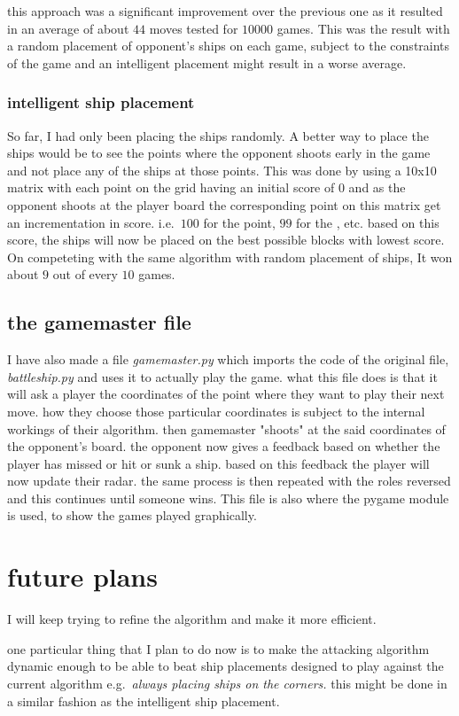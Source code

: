 \documentclass{article}
\begin{document}
	this approach was a significant improvement over the previous one as it resulted in an average of about $44$ moves tested for $10000$ games. This was the result with a random placement of opponent's ships on each game, subject to the constraints of the game and an intelligent placement might result in a worse average.
	
	\subsubsection{intelligent ship placement}
	
	So far, I had only been placing the ships randomly. A better way to place the ships would be to see the points where the opponent shoots early in the game and not place any of the ships at those points. This was done by using a 10x10 matrix with each point on the grid having an initial score of $0$ and as the opponent shoots at the player board the corresponding point on this matrix get an incrementation in score. i.e.\ $100$ for the  point, $99$ for the , etc. based on this score, the ships will now be placed on the best possible blocks with lowest score. On competeting with the same algorithm with random placement of ships, It won about $9$ out of every $10$ games.
	
	\subsection{the gamemaster file} 
	
	I have also made a file \textit{gamemaster.py} which imports the code of the original file, \textit{battleship.py} and uses it to actually play the game. what this file does is that it will ask a player the coordinates of the point where they want to play their next move. how they choose those particular coordinates is subject to the internal workings of their algorithm. then gamemaster "shoots" at the said coordinates of the opponent's board. the opponent now gives a feedback based on whether the player has missed or hit or sunk a ship. based on this feedback the player will now update their radar. the same process is then repeated with the roles reversed and this continues until someone wins. This file is also where the pygame module is used, to show the games played graphically.
	
	
   
   \section{future plans}
  
  I will keep trying to refine the algorithm and make it more efficient.
  
  one particular thing that I plan to do now is to make the attacking algorithm dynamic enough to be able to beat ship placements designed to play against the current algorithm e.g.\ \textit{always placing ships on the corners.} this might be done in a similar fashion as the intelligent ship placement. 
\end{document}

